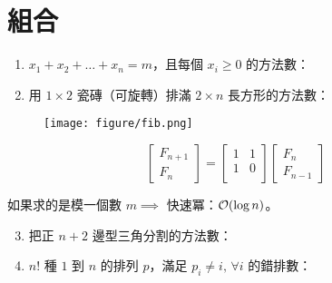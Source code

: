 \documentclass[standalone]{beamer}
\begin{document}
\section{組合}

\begin{frame}{}
  \begin{enumerate}[<+->]
    \item $x_1 + x_2 + \dots + x_n = m$，且每個 $x_i \geq 0$ 的方法數：
    \item 用 $1 \times 2$ 瓷磚（可旋轉）排滿 $2 \times n$ 長方形的方法數： \\
  \end{enumerate}
    \pause
  \begin{missue}
  \begin{figure}
    \texttt{[image: figure/fib.png]}
  \end{figure}
  \end{missue}
\end{frame}

\begin{frame}
  \[
  \begin{bmatrix}
    F_{n+1} \\
    F_{n}
  \end{bmatrix}
  =
  \begin{bmatrix}
    1 & 1 \\
    1 & 0 \\
  \end{bmatrix}
  \begin{bmatrix}
    F_{n} \\
    F_{n-1}
  \end{bmatrix}
\]
\pause

如果求的是模一個數 $m \implies$ 快速冪：$\mathcal{O}(\log n)$。
\end{frame}

\begin{frame}
  \begin{enumerate}[<+->]
    \setcounter{enumi}{2}
  \item 把正 $n+2$ 邊型三角分割的方法數：
  \item $n!$ 種 $1$ 到 $n$ 的排列 $p$，滿足 $p_i \neq i, \, \forall i$ 的錯排數：
    \onslide<+->{\[ \sum_{k = 0}^n (-1)^k {n \choose k} (n-k)! \]}
  \end{enumerate}
\end{frame}
\end{document}
